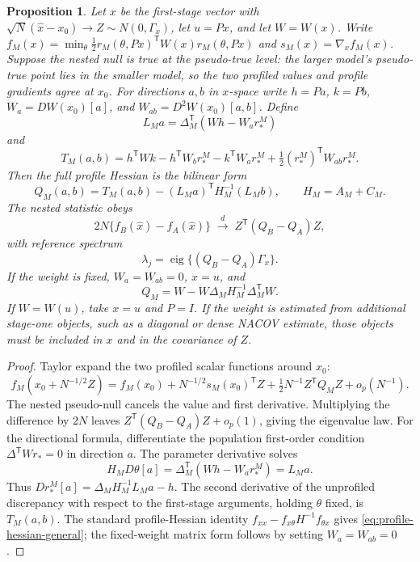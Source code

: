 \documentclass[11pt]{article}
\newcommand{\T}{^{\mathsf{T}}}
\newcommand{\rs}{r_{*}}
\theoremstyle{plain}
\newtheorem{proposition}{Proposition}
\theoremstyle{remark}
\begin{document}
\begin{proposition}
\label{prop:nested}
Let $x$ be the first-stage vector with $\sqrt N(\hat x-x_{0})\to Z\sim
N(0,\Gamma_{x})$, let $u=P x$, and let $W=W(x)$. Write
$f_{M}(x)=\min_{\theta}\tfrac12 r_{M}(\theta,Px)\T W(x)r_{M}(\theta,Px)$ and
$s_{M}(x)=\nabla_{x}f_{M}(x)$.
Suppose the nested null is true at the pseudo-true level: the larger model's
pseudo-true point lies in the smaller model, so the two profiled values and
profile gradients agree at $x_{0}$.
For directions $a,b$ in $x$-space write $h=Pa$, $k=Pb$,
$W_{a}=DW(x_{0})[a]$, and $W_{ab}=D^{2}W(x_{0})[a,b]$. Define
\[
  L_{M}a=\Delta_{M}\T(W h-W_{a}\rs^{M})
\]
and
\[
  T_{M}(a,b)=
  h\T W k-h\T W_{b}\rs^{M}-k\T W_{a}\rs^{M}
  +\tfrac12(\rs^{M})\T W_{ab}\rs^{M}.
\]
Then the full profile Hessian is the bilinear form
\begin{equation}
  Q_{M}(a,b)=T_{M}(a,b)-(L_{M}a)\T H_{M}^{-1}(L_{M}b),
  \qquad H_{M}=A_{M}+C_{M}.
  \label{eq:profile-hessian-general}
\end{equation}
The nested statistic obeys
\[
  2N\{f_{B}(\hat x)-f_{A}(\hat x)\}
  \;\xrightarrow{d}\;
  Z\T (Q_{B}-Q_{A})Z,
\]
with reference spectrum
\[
  \lambda_{j}=\operatorname{eig}\{(Q_{B}-Q_{A})\Gamma_{x}\}.
\]
If the weight is fixed, $W_{a}=W_{ab}=0$, $x=u$, and
\begin{equation}
  Q_{M}=W-W\Delta_{M}H_{M}^{-1}\Delta_{M}\T W.
  \label{eq:profile-hessian-fixed}
\end{equation}
If $W=W(u)$, take $x=u$ and $P=I$. If the weight is estimated from additional
stage-one objects, such as a diagonal or dense NACOV estimate, those objects
must be included in $x$ and in the covariance of $Z$.
\end{proposition}

\begin{proof}
Taylor expand the two profiled scalar functions around $x_{0}$:
\[
  f_{M}(x_{0}+N^{-1/2}Z)
  =f_{M}(x_{0})+N^{-1/2}s_{M}(x_{0})\T Z
   +\tfrac12N^{-1}Z\T Q_{M}Z+o_{p}(N^{-1}).
\]
The nested pseudo-null cancels the value and first derivative. Multiplying the
difference by $2N$ leaves $Z\T(Q_{B}-Q_{A})Z+o_{p}(1)$, giving the eigenvalue
law. For the directional formula, differentiate the population first-order
condition $\Delta\T W\rs=0$ in direction $a$. The parameter derivative solves
\[
  H_{M}D\theta[a]=\Delta_{M}\T(W h-W_{a}\rs^{M})=L_{M}a.
\]
Thus
$D\rs^{M}[a]=\Delta_{M}H_{M}^{-1}L_{M}a-h$. The second derivative of the
unprofiled discrepancy with respect to the first-stage arguments, holding
$\theta$ fixed, is $T_{M}(a,b)$. The standard profile-Hessian identity
$f_{xx}-f_{x\theta}H^{-1}f_{\theta x}$ gives
\eqref{eq:profile-hessian-general}; the fixed-weight matrix form follows by
setting $W_{a}=W_{ab}=0$.
\end{proof}
\end{document}
